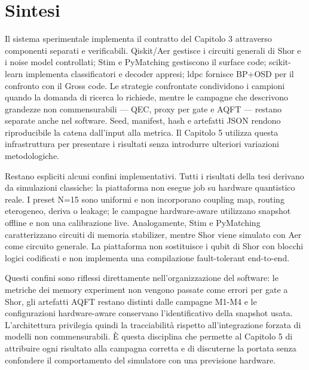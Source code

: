 \section{Sintesi}\label{sec:finale_4_9}

Il sistema sperimentale implementa il contratto del Capitolo 3 attraverso componenti separati e verificabili. Qiskit/Aer gestisce i circuiti generali di Shor e i noise model controllati; Stim e PyMatching gestiscono il surface code; scikit-learn implementa classificatori e decoder appresi; ldpc fornisce BP+OSD per il confronto con il Gross code. Le strategie confrontate condividono i campioni quando la domanda di ricerca lo richiede, mentre le campagne che descrivono grandezze non commensurabili --- QEC, proxy per gate e AQFT --- restano separate anche nel software. Seed, manifest, hash e artefatti JSON rendono riproducibile la catena dall'input alla metrica. Il Capitolo 5 utilizza questa infrastruttura per presentare i risultati senza introdurre ulteriori variazioni metodologiche.

Restano espliciti alcuni confini implementativi. Tutti i risultati della tesi derivano da simulazioni classiche: la piattaforma non esegue job su hardware quantistico reale. I preset N=15 sono uniformi e non incorporano coupling map, routing eterogeneo, deriva o leakage; le campagne hardware-aware utilizzano snapshot offline e non una calibrazione live. Analogamente, Stim e PyMatching caratterizzano circuiti di memoria stabilizer, mentre Shor viene simulato con Aer come circuito generale. La piattaforma non sostituisce i qubit di Shor con blocchi logici codificati e non implementa una compilazione fault-tolerant end-to-end.

Questi confini sono riflessi direttamente nell'organizzazione del software: le metriche dei memory experiment non vengono passate come errori per gate a Shor, gli artefatti AQFT restano distinti dalle campagne M1-M4 e le configurazioni hardware-aware conservano l'identificativo della snapshot usata. L'architettura privilegia quindi la tracciabilità rispetto all'integrazione forzata di modelli non commensurabili. È questa disciplina che permette al Capitolo 5 di attribuire ogni risultato alla campagna corretta e di discuterne la portata senza confondere il comportamento del simulatore con una previsione hardware.
